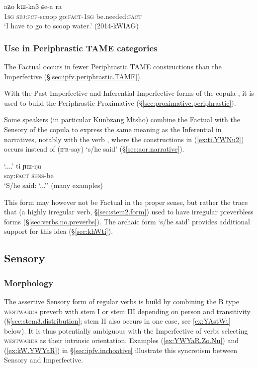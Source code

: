 \begin{exe}
\ex \label{ex:Cea.ra}
\gll aʑo kɯ-kaβ ɕe-a ra \\
\textsc{1sg} \textsc{sbj}:\textsc{pcp}-scoop go:\textsc{fact}-\textsc{1sg} be.needed:\textsc{fact} \\
\glt `I have to go to scoop water.' (2014-kWlAG)
\end{exe} 

\subsubsection{Use in Periphrastic TAME categories} \label{sec:fact.periphrastic}
The Factual occurs in fewer Periphrastic TAME constructions than the Imperfective (§\ref{sec:ipfv.periphrastic.TAME}).

With the Past Imperfective  and Inferential Imperfective  forms of the copula , it is used to build the Periphrastic Proximative (§\ref{sec:proximative.periphrastic}).

Some speakers (in particular Kunbzang Mtsho) combine the Factual with the Sensory  of the copula to express the same meaning as the Inferential in narratives, notably with the verb , where the constructions in (\ref{ex:ti.YWNu2}) occurs instead of  (\textsc{ifr}-say) `s/he said' (§\ref{sec:aor.narrative}).

\begin{exe}
\ex \label{ex:ti.YWNu2}
\gll `....' ti ɲɯ-ŋu \\
{ } say:\textsc{fact} \textsc{sens}-be \\
\glt `S/he said: `...'' (many examples)
\end{exe}

This form may however not be Factual in the proper sense, but rather the trace that  (a highly irregular verb, §\ref{sec:stem2.form}) used to have irregular preverbless forms (§\ref{sec:verbs.no.preverbs}). The archaic form  `s/he said' provides additional support for this idea (§\ref{sec:khWti}).


\subsection{Sensory} \label{sec:sensory}
\subsubsection{Morphology} \label{sec:sensory.morphology}
The assertive Sensory form of regular verbs is build by combining the B type \textsc{westwards}  preverb with stem I or stem III depending on person and transitivity (§\ref{sec:stem3.distribution}; stem II also occurs in one case, see \ref{ex:YAstWt} below). It is thus potentially ambiguous with the Imperfective of verbs selecting \textsc{westwards} as their intrinsic orientation. Examples (\ref{ex:YWYaR.Zo.Nu}) and (\ref{ex:kW.YWYaR}) in §\ref{sec:ipfv.inchoative} illustrate this syncretism between Sensory and Imperfective.


